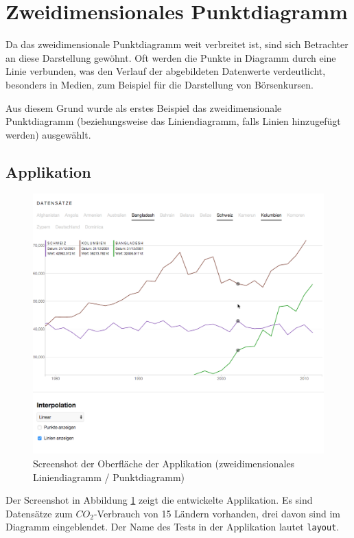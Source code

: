 \section{Zweidimensionales Punktdiagramm}

Da das zweidimensionale Punktdiagramm weit verbreitet ist, sind sich Betrachter an diese Darstellung gewöhnt. Oft werden die Punkte in Diagramm durch eine Linie verbunden, was den Verlauf der abgebildeten Datenwerte verdeutlicht, besonders in Medien, zum Beispiel für die Darstellung von Börsenkursen. 

Aus diesem Grund wurde als erstes Beispiel das zweidimensionale Punktdiagramm (beziehungsweise das Liniendiagramm, falls Linien hinzugefügt werden) ausgewählt.


\subsection{Applikation}

\begin{figure}[!htbp]
	\centering
	\includegraphics[width=\linewidth]{images/2dline}
	\caption{Screenshot der Oberfläche der Applikation (zweidimensionales Liniendiagramm / Punktdiagramm)}
	\label{fig:screenshot}
\end{figure}

Der Screenshot in Abbildung \ref{fig:screenshot} zeigt die entwickelte Applikation. Es sind Datensätze \cite{worldbank} zum $CO_2$-Verbrauch von 15 Ländern vorhanden, drei davon sind im Diagramm eingeblendet. Der Name des Tests in der Applikation lautet \texttt{layout}.

